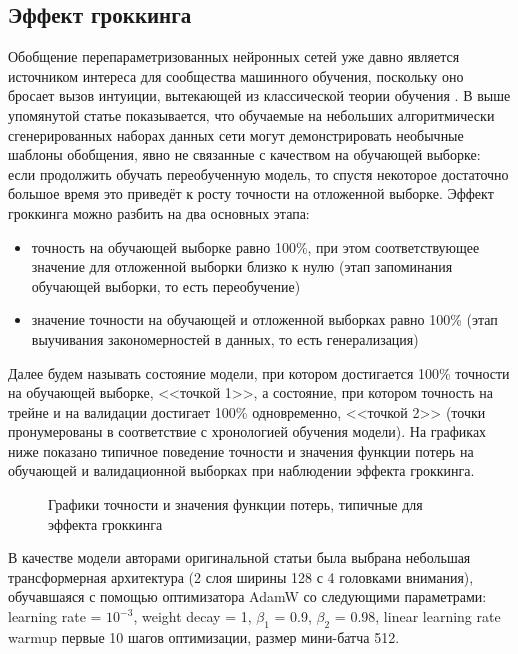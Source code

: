 \documentclass{article}
\begin{document}
\subsection{Эффект гроккинга}
Обобщение перепараметризованных нейронных сетей уже давно является источником интереса для
сообщества машинного обучения, поскольку оно бросает вызов интуиции, вытекающей из классической теории обучения \cite{double_descent, dd_avoid}. В выше упомянутой статье \cite{grokking_start} показывается, что обучаемые на небольших алгоритмически сгенерированных наборах данных сети могут демонстрировать необычные шаблоны обобщения, явно не связанные с качеством на обучающей выборке: если продолжить обучать переобученную модель, то спустя некоторое достаточно большое время это приведёт к росту точности на отложенной выборке. Эффект гроккинга можно разбить на два основных этапа:
\begin{itemize}
    \item точность на обучающей выборке равно 100\%, при этом соответствующее значение для отложенной выборки близко к нулю (этап запоминания обучающей выборки, то есть переобучение)
    \item значение точности на обучающей и отложенной выборках равно 100\% (этап выучивания закономерностей в данных, то есть генерализация)
\end{itemize}
\par Далее будем называть состояние модели, при котором достигается 100\% точности на обучающей выборке, <<точкой 1>>, а состояние, при котором точность на трейне и на валидации достигает 100\% одновременно, <<точкой 2>> (точки пронумерованы в соответствие с хронологией обучения модели). На графиках ниже показано типичное поведение точности и значения функции потерь на обучающей и валидационной выборках при наблюдении эффекта гроккинга.
\begin{figure}[h]
\centering
{}
\caption{Графики точности и значения функции потерь, типичные для эффекта гроккинга}
\label{fig:fig0}
\end{figure}
\par В качестве модели авторами оригинальной статьи \cite{grokking_start} была выбрана небольшая трансформерная архитектура (2 слоя ширины 128 с 4 головками внимания), обучавшаяся с помощью оптимизатора AdamW со следующими параметрами: learning rate =  $10^{-3}$, weight decay = 1, $\beta_1$ = 0.9, $\beta_2$ = 0.98, linear learning rate warmup первые 10 шагов оптимизации, размер мини-батча 512.
\end{document}
